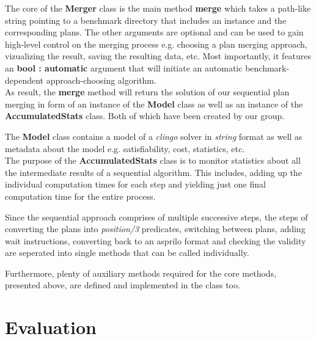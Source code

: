 \documentclass{llncs}
\begin{document}
The core of the \textbf{Merger} class is the main method \textbf{merge} which takes a path-like string pointing to a benchmark directory that includes an instance and the corresponding plans. The other arguments are optional and can be used to gain high-level control on the merging process e.g. choosing a plan merging approach, vizualizing the result, saving the resulting data, etc. Most importantly, it features an \textbf{bool : automatic} argument that will initiate an automatic benchmark-dependent approach-choosing algorithm.\\
As result, the \textbf{merge} method will return the solution of our sequential plan merging in form of an instance of the \textbf{Model} class as well as an instance of the \textbf{AccumulatedStats} class. Both of which have been created by our group.

The \textbf{Model} class contains a model of a \emph{clingo} solver in \emph{string} format as well as metadata about the model e.g. satisfiability, cost, statistics, etc.\\
The purpose of the \textbf{AccumulatedStats} class is to monitor statistics about all the intermediate results of a sequential algorithm. This includes, adding up the individual computation times for each step and yielding just one final computation time for the entire process.

Since the sequential approach comprises of multiple successive steps, the steps of converting the plans into \emph{position/3} predicates, switching between plans, adding wait instructions, converting back to an asprilo format and checking the validity are seperated into single methods that can be called individually.

Furthermore, plenty of auxiliary methods required for the core methods, presented above, are defined and implemented in the class too.



\section{Evaluation}
\end{document}
